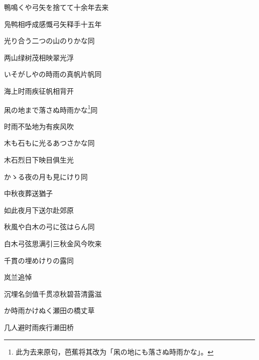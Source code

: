 \begin{haiku}
    {\FH 鴨鳴くや弓矢を捨てて十余年}\hfill{\FH 去来}

    {\FK 凫鸭相呼成感慨弓矢释手十五年}
\end{haiku}

\begin{haiku}
    {\FH 光り合う二つの山のりかな}\hfill{\FH 同}

    {\FK 两山绿树茂相映翠光浮}
\end{haiku}

\begin{haiku}
    {\FH いそがしやの時雨の真帆片帆}\hfill{\FH 同}

    {\FK 海上时雨疾征帆相背开}
\end{haiku}

\begin{haiku}
    {\FH 凩の地まで落さぬ時雨かな\footnote{\FT 此为去来原句，芭蕉将其改为「凩の地にも落さぬ時雨かな」。}}\hfill{\FH 同}

    {\FK 时雨不坠地为有疾风吹}
\end{haiku}

\begin{haiku}
    {\FH 木も石もに光るあつさかな}\hfill{\FH 同}

    {\FK 木石烈日下映目俱生光}
\end{haiku}

\begin{haiku}
    {\FH かゝる夜の月も見にけり}\hfill{\FH 同}

    {\FK 中秋夜葬送猶子}

    {\FK 如此夜月下送尔赴郊原}
\end{haiku}

\begin{haiku}
    {\FH 秋風や白木の弓に弦はらん}\hfill{\FH 同}

    {\FK 白木弓弦思满引三秋金风今吹来}
\end{haiku}

\begin{haiku}
    {\FH 千貫の埋めけりの露}\hfill{\FH 同}

    {\FK 岚兰追悼}

    {\FK 沉埋名剑值千贯凉秋碧苔清露滋}
\end{haiku}

\begin{haiku}
    {\FH {}か時雨かけぬく瀬田の橋}\hfill{\FH 丈草}

    {\FK 几人避时雨疾行濑田桥}
\end{haiku}

